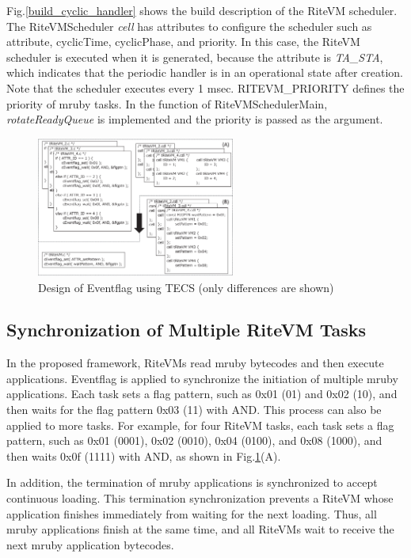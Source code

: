 \documentclass[S,R,E]{article/compsoft}
\begin{document}
Fig.\ref{build_cyclic_handler} shows the build description of the RiteVM scheduler.
The RiteVMScheduler {\it cell} has attributes to configure the scheduler such as attribute, cyclicTime, cyclicPhase, and priority.
In this case, the RiteVM scheduler is executed when it is generated, because the attribute is {\it TA\_STA}, which indicates that the periodic handler is in an operational state after creation.
Note that the scheduler executes every 1 msec.
RITEVM\_PRIORITY defines the priority of mruby tasks.
In the function of RiteVMSchedulerMain, {\it rotateReadyQueue} is implemented and the priority is passed as the argument.


\begin{figure}[t]
    \centering
    \includegraphics[width=6.5cm,clip]{figure/Eventflag.eps}
\caption{Design of Eventflag using TECS (only differences are shown)}
\label{fig:Eventflag}
\end{figure}

\subsection{Synchronization of Multiple RiteVM Tasks}
In the proposed framework, RiteVMs read mruby bytecodes and then execute applications.
Eventflag is applied to synchronize the initiation of multiple mruby applications.
Each task sets a flag pattern, such as 0x01 (01) and 0x02 (10), and then waits for the flag pattern 0x03 (11) with AND.
This process can also be applied to more tasks.
For example, for four RiteVM tasks, each task sets a flag pattern, such as 0x01 (0001), 0x02 (0010), 0x04 (0100), and 0x08 (1000), and then waits 0x0f (1111) with AND, as shown in Fig.\ref{fig:Eventflag}(A).

In addition, the termination of mruby applications is synchronized to accept continuous loading.
This termination synchronization prevents a RiteVM whose application finishes immediately from waiting for the next loading.
Thus, all mruby applications finish at the same time, and all RiteVMs wait to receive the next mruby application bytecodes. 
\end{document}
